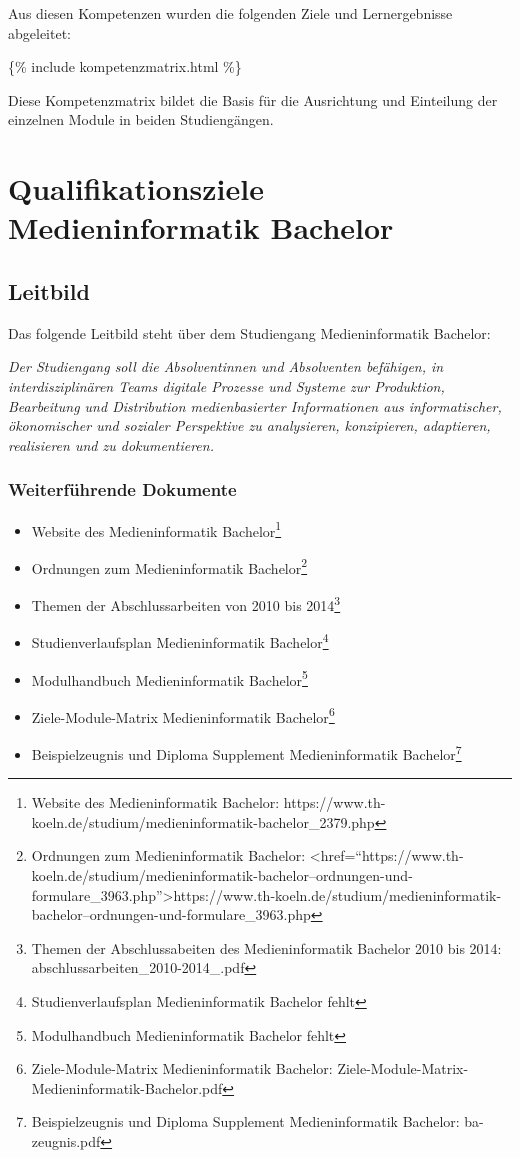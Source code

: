Aus diesen Kompetenzen wurden die folgenden Ziele und Lernergebnisse
abgeleitet:

\{\% include kompetenzmatrix.html \%\}

Diese Kompetenzmatrix bildet die Basis für die Ausrichtung und
Einteilung der einzelnen Module in beiden Studiengängen.

\chapter{Qualifikationsziele Medieninformatik
Bachelor}\label{qualifikationsziele-medieninformatik-bachelor}

\section{Leitbild}\label{leitbild}

Das folgende Leitbild steht über dem Studiengang Medieninformatik
Bachelor:

\emph{Der Studiengang soll die Absolventinnen und Absolventen befähigen,
in interdisziplinären Teams digitale Prozesse und Systeme zur
Produktion, Bearbeitung und Distribution medienbasierter Informationen
aus informatischer, ökonomischer und sozialer Perspektive zu
analysieren, konzipieren, adaptieren, realisieren und zu dokumentieren.}

\subsection{Weiterführende
Dokumente}\label{weiterfuxfchrende-dokumente}

\begin{itemize}
\tightlist
\item
  Website des Medieninformatik Bachelor\footnote{Website des
    Medieninformatik Bachelor:
    https://www.th-koeln.de/studium/medieninformatik-bachelor\_2379.php}
\item
  Ordnungen zum Medieninformatik Bachelor\footnote{Ordnungen zum
    Medieninformatik Bachelor:
    \textless{}href=``https://www.th-koeln.de/studium/medieninformatik-bachelor--ordnungen-und-formulare\_3963.php''\textgreater{}https://www.th-koeln.de/studium/medieninformatik-bachelor--ordnungen-und-formulare\_3963.php}
\item
  Themen der Abschlussarbeiten von 2010 bis 2014\footnote{Themen der
    Abschlussabeiten des Medieninformatik Bachelor 2010 bis 2014:
    abschlussarbeiten\_2010-2014\_.pdf}
\item
  Studienverlaufsplan Medieninformatik Bachelor\footnote{Studienverlaufsplan
    Medieninformatik Bachelor fehlt}
\item
  Modulhandbuch Medieninformatik Bachelor\footnote{Modulhandbuch
    Medieninformatik Bachelor fehlt}
\item
  Ziele-Module-Matrix Medieninformatik Bachelor\footnote{Ziele-Module-Matrix
    Medieninformatik Bachelor:
    Ziele-Module-Matrix-Medieninformatik-Bachelor.pdf}
\item
  Beispielzeugnis und Diploma Supplement Medieninformatik
  Bachelor\footnote{Beispielzeugnis und Diploma Supplement
    Medieninformatik Bachelor: ba-zeugnis.pdf}
\end{itemize}

